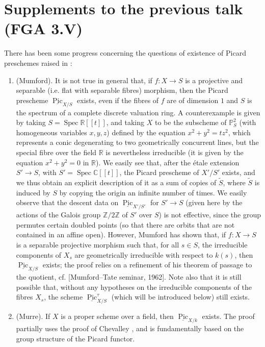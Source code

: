\section{Supplements to the previous talk (FGA 3.V)}\label{fga3.iv-0}

There has been some progress concerning the questions of existence of Picard preschemes raised in :

\begin{enumerate}[label=\alph*.]
    \item (Mumford).
          It is not true in general that, if $f\colon X\to S$ is a projective and separable (i.e. flat with separable fibres) morphism, then the Picard prescheme $\underline{\operatorname{Pic}}_{X/S}$ exists, even if the fibres of $f$ are of dimension $1$ and $S$ is the spectrum of a complete discrete valuation ring.
          A counterexample is given by taking $S=\operatorname{Spec}\mathbb{R}[{[t]}]$, and taking $X$ to be the subscheme of $\mathbb{P}_S^2$ (with homogeneous variables $x,y,z$) defined by the equation $x^2+y^2=tz^2$, which represents a conic degenerating to two geometrically concurrent lines, but the special fibre over the field $\mathbb{R}$ is nevertheless irreducible (it is given by the equation $x^2+y^2=0$ in $\mathbb{R}$).
          We easily see that, after the étale extension $S'\to S$, with $S'=\operatorname{Spec}\mathbb{C}[{[t]}]$, the Picard prescheme of $X'/S'$ exists, and we thus obtain an explicit description of it as a sum of copies of $\widetilde{S}$, where $\widetilde{S}$ is induced by $S$ by copying the origin an infinite number of times.
          We easily observe that the descent data on $\underline{\operatorname{Pic}}_{X'/S'}$ for $S'\to S$ (given here by the actions of the Galois group $\mathbb{Z}/2\mathbb{Z}$ of $S'$ over $S$) is not effective, since the group permutes certain doubled points (so that there are orbits that are not contained in an affine open).
          However, Mumford has shown that, if $f\colon X\to S$ is a separable projective morphism such that, for all $s\in S$, the irreducible components of $X_s$ are geometrically irreducible with respect to $k(s)$, then $\underline{\operatorname{Pic}}_{X/S}$ exists;
          the proof relies on a refinement of his theorem of passage to the quotient, cf. [Mumford–Tate seminar, 1962].
          Note also that it is still possible that, without any hypotheses on the irreducible components of the fibres $X_s$, the scheme $\underline{\operatorname{Pic}}_{X/S}^\tau$ (which will be introduced below) still exists.
    \item (Murre).
          If $X$ is a proper scheme over a field, then $\underline{\operatorname{Pic}}_{X/k}$ exists.
          The proof partially uses the proof of Chevalley \cite{Che1960}, and is fundamentally based on the group structure of the Picard functor.
\end{enumerate}


